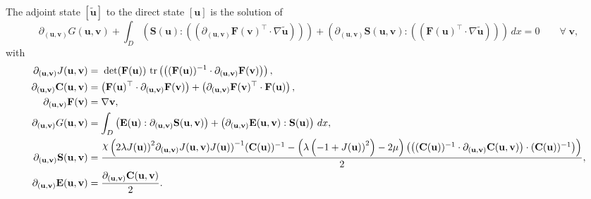 \documentclass[preview]{standalone}
\let\oldcdot\cdot
\let\cdot\oldcdot
\begin{document}
The adjoint state $\left[ \tilde{\mathbf{ u }}\right]$ to the direct state $\left[ {\mathbf{ u }}\right]$ is the solution of
\begin{dmath*}
\partial_{({\mathbf{ u }},{\mathbf{ v }})} G({\mathbf{ u }},{\mathbf{ v }}) +  \int_{D} \left( \mathbf S({\mathbf{ u }}) \mathrel{:} \left( \left(  \partial_{({\mathbf{ u }},{\mathbf{ v }})} \mathbf F({\mathbf{ v }})^\top  \cdot  \nabla \tilde{\mathbf{ u }}  \right) \right)\right) + \left( \partial_{({\mathbf{ u }},{\mathbf{ v }})} \mathbf S({\mathbf{ u }},{\mathbf{ v }}) \mathrel{:} \left( \left(  \mathbf F({\mathbf{ u }})^\top  \cdot  \nabla \tilde{\mathbf{ u }}  \right) \right)\right) \,dx = 0\qquad \forall\; {\mathbf{ v }} , 
\end{dmath*}
with 
\begin{align*}
\partial_{({\mathbf{ u }},{\mathbf{ v }})} J({\mathbf{ u }},{\mathbf{ v }}) &=  \;\operatorname{det}(\mathbf F({\mathbf{ u }}))   \,\operatorname{tr}\left(\left(  (\mathbf F({\mathbf{ u }}))^{-1}  \cdot \partial_{({\mathbf{ u }},{\mathbf{ v }})} \mathbf F({\mathbf{ v }}) \right)\right) ,\\
\partial_{({\mathbf{ u }},{\mathbf{ v }})} \mathbf C({\mathbf{ u }},{\mathbf{ v }}) &= \left(  \mathbf F({\mathbf{ u }})^\top  \cdot \partial_{({\mathbf{ u }},{\mathbf{ v }})} \mathbf F({\mathbf{ v }}) \right) + \left(  \partial_{({\mathbf{ u }},{\mathbf{ v }})} \mathbf F({\mathbf{ v }})^\top  \cdot \mathbf F({\mathbf{ u }}) \right),\\
\partial_{({\mathbf{ u }},{\mathbf{ v }})} \mathbf F({\mathbf{ v }}) &=  \nabla {\mathbf{ v }} ,\\
\partial_{({\mathbf{ u }},{\mathbf{ v }})} G({\mathbf{ u }},{\mathbf{ v }}) &=  \int_{D} \left( \mathbf E({\mathbf{ u }}) \mathrel{:} \partial_{({\mathbf{ u }},{\mathbf{ v }})} \mathbf S({\mathbf{ u }},{\mathbf{ v }}) \right) + \left( \partial_{({\mathbf{ u }},{\mathbf{ v }})} \mathbf E({\mathbf{ u }},{\mathbf{ v }}) \mathrel{:} \mathbf S({\mathbf{ u }}) \right) \,dx,\\
\partial_{({\mathbf{ u }},{\mathbf{ v }})} \mathbf S({\mathbf{ u }},{\mathbf{ v }}) &= \frac{\raisebox{\depth}{$\chi$} \left(2 \lambda {J({\mathbf{ u }}))}^{2} \partial_{({\mathbf{ u }},{\mathbf{ v }})} J({\mathbf{ u }},{\mathbf{ v }}) {J({\mathbf{ u }}))}^{-1}  (\mathbf C({\mathbf{ u }}))^{-1}  - \left(\lambda \left(-1 + {J({\mathbf{ u }}))}^{2}\right) - 2 \mu\right) \left( \left(  (\mathbf C({\mathbf{ u }}))^{-1}  \cdot \partial_{({\mathbf{ u }},{\mathbf{ v }})} \mathbf C({\mathbf{ u }},{\mathbf{ v }}) \right) \cdot  (\mathbf C({\mathbf{ u }}))^{-1}  \right)\right)}{2},\\
\partial_{({\mathbf{ u }},{\mathbf{ v }})} \mathbf E({\mathbf{ u }},{\mathbf{ v }}) &= \frac{\partial_{({\mathbf{ u }},{\mathbf{ v }})} \mathbf C({\mathbf{ u }},{\mathbf{ v }})}{2}.
 \end{align*}
\end{document}
